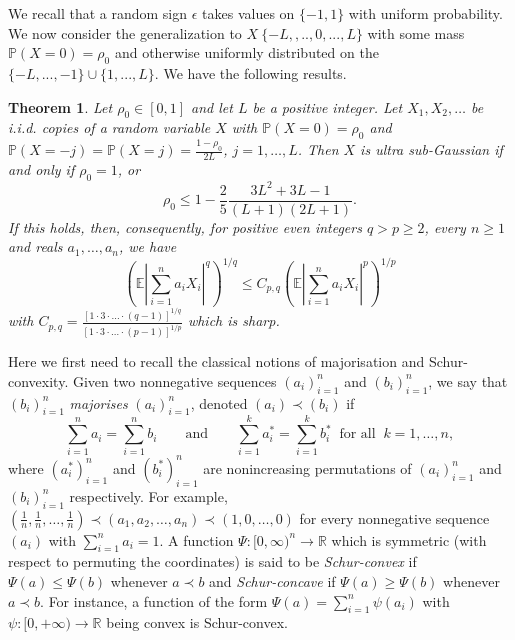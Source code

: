 \documentclass[10pt]{article}
\newcommand{\Pp}{\mathbb{P}}
\newcommand{\E}{\mathbb{E}}
\newcommand{\1}{\textbf{1}}
\newcommand{\R}{\mathbb{R}}
\newcommand{\p}[1]{\mathbb{P}\left( #1 \right)}
\newtheorem{theorem}{Theorem}
\theoremstyle{remark}
\theoremstyle{definition}
\begin{document}
We recall that a random sign $\epsilon$ takes values on $\{-1,1\}$ with uniform probability. We now consider the generalization to $X ~ \{-L,,..,0,...,L\}$ with some mass $\Pp(X = 0) = \rho_0$ and otherwise uniformly distributed on the $\{-L,...,-1\} \cup \{1,...,L\}$. We have the following results.

\begin{theorem}\label{thm:USG}
Let $\rho_0 \in [0,1]$ and let $L$ be a positive integer. Let $X_1, X_2,\dots$ be i.i.d. copies of a random variable $X$ with $\p{X=0} = \rho_0$ and $\p{X = -j} = \p{X = j} = \frac{1-\rho_0}{2L}$, $j = 1,\dots,L$. Then $X$ is ultra sub-Gaussian if and only if $\rho_0 = 1$, or
\begin{equation}\label{eq:USG-rho}
\rho_0 \leq 1 - \frac{2}{5}\frac{3L^2+3L-1}{(L+1)(2L+1)}.
\end{equation}
If this holds, then, consequently, for positive even integers $q > p \geq 2$, every $n \geq 1$ and reals $a_1,\dots,a_n$, we have
\begin{equation}\label{eq:Khin-even}
\left(\E\left|\sum_{i=1}^n a_iX_i\right|^q\right)^{1/q} \leq C_{p,q}\left(\E\left|\sum_{i=1}^n a_iX_i\right|^p\right)^{1/p}
\end{equation}
with $C_{p,q} = \frac{[1\cdot 3\cdot\ldots \cdot (q-1)]^{1/q}}{[1\cdot 3\cdot\ldots \cdot (p-1)]^{1/p}}$ which is sharp.
\end{theorem}

Here we first need to recall the classical notions of majorisation and Schur-convexity. Given two nonnegative sequences $(a_i)_{i=1}^n$ and $(b_i)_{i=1}^n$, we say that $(b_i)_{i=1}^n$ \emph{majorises} $(a_i)_{i=1}^n$, denoted $(a_i) \prec (b_i)$ if
\[
\sum_{i=1}^n a_i = \sum_{i=1}^n b_i \qquad \text{and} \qquad \sum_{i=1}^k a_i^* = \sum_{i=1}^k b_i^* \ \text{ for all } \ k = 1,\ldots,n,
\]
where $(a_i^*)_{i=1}^n$ and $(b_i^*)_{i=1}^n$ are nonincreasing permutations of $(a_i)_{i=1}^n$ and $(b_i)_{i=1}^n$ respectively. For example, $(\frac{1}{n},\frac{1}{n},\dots,\frac{1}{n}) \prec (a_1,a_2,\dots,a_n) \prec (1,0,\dots,0)$ for every nonnegative sequence $(a_i)$ with $\sum_{i=1}^n a_i = 1$. A function $\Psi\colon [0,\infty)^n \to \R$ which is symmetric (with respect to permuting the coordinates) is said to be \emph{Schur-convex} if $\Psi(a) \leq \Psi(b)$ whenever $a \prec b$ and \emph{Schur-concave} if $\Psi(a) \geq \Psi(b)$ whenever $a \prec b$. For instance, a function of the form $\Psi(a) = \sum_{i=1}^n \psi(a_i)$ with $\psi\colon [0,+\infty) \to \R$ being convex is Schur-convex.
\end{document}
